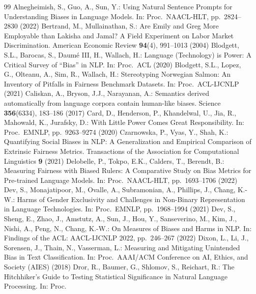 \documentclass[runningheads]{llncs}
\begin{document}
\begin{thebibliography}{99}
 Alnegheimish, S., Guo, A., Sun, Y.: Using Natural
Sentence Prompts for Understanding Biases in Language Models. In: Proc.\
NAACL-HLT, pp.\ 2824--2830 (2022)
 Bertrand, M., Mullainathan, S.: Are Emily and Greg More
Employable than Lakisha and Jamal? A Field Experiment on Labor Market
Discrimination. American Economic Review \textbf{94}(4), 991--1013 (2004)
\bibitem{blodgett2020} Blodgett, S.L., Barocas, S., Daum\'e III, H., Wallach,
H.: Language (Technology) is Power: A Critical Survey of ``Bias'' in NLP. In:
Proc.\ ACL (2020)
 Blodgett, S.L., Lopez, G., Olteanu, A., Sim, R.,
Wallach, H.: Stereotyping Norwegian Salmon: An Inventory of Pitfalls in
Fairness Benchmark Datasets. In: Proc.\ ACL-IJCNLP (2021)
 Caliskan, A., Bryson, J.J., Narayanan, A.: Semantics
derived automatically from language corpora contain human-like biases. Science
\textbf{356}(6334), 183--186 (2017)
 Card, D., Henderson, P., Khandelwal, U., Jia, R., Mahowald, K., Jurafsky, D.:
With Little Power Comes Great Responsibility. In: Proc.\ EMNLP,
pp.\ 9263--9274 (2020)
 Czarnowska, P., Vyas, Y., Shah, K.: Quantifying Social
Biases in NLP: A Generalization and Empirical Comparison of Extrinsic Fairness
Metrics. Transactions of the Association for Computational Linguistics
\textbf{9} (2021)
 Delobelle, P., Tokpo, E.K., Calders, T., Berendt, B.:
Measuring Fairness with Biased Rulers: A Comparative Study on Bias Metrics for
Pre-trained Language Models. In: Proc.\ NAACL-HLT, pp.\ 1693--1706 (2022)
\bibitem{dev2021} Dev, S., Monajatipoor, M., Ovalle, A., Subramonian, A.,
Phillips, J., Chang, K.-W.: Harms of Gender Exclusivity and Challenges in
Non-Binary Representation in Language Technologies. In: Proc.\ EMNLP,
pp.\ 1968--1994 (2021)
 Dev, S., Sheng, E., Zhao, J., Amstutz, A., Sun, J., Hou, Y.,
Sanseverino, M., Kim, J., Nishi, A., Peng, N., Chang, K.-W.: On Measures of
Biases and Harms in NLP. In: Findings of the ACL: AACL-IJCNLP 2022,
pp.\ 246--267 (2022)
 Dixon, L., Li, J., Sorensen, J., Thain, N., Vasserman, L.:
Measuring and Mitigating Unintended Bias in Text Classification. In: Proc.\
AAAI/ACM Conference on AI, Ethics, and Society (AIES) (2018)
\bibitem{dror2018} Dror, R., Baumer, G., Shlomov, S., Reichart, R.: The Hitchhiker's Guide to
Testing Statistical Significance in Natural Language Processing. In: Proc.\

\end{thebibliography}
\end{document}
